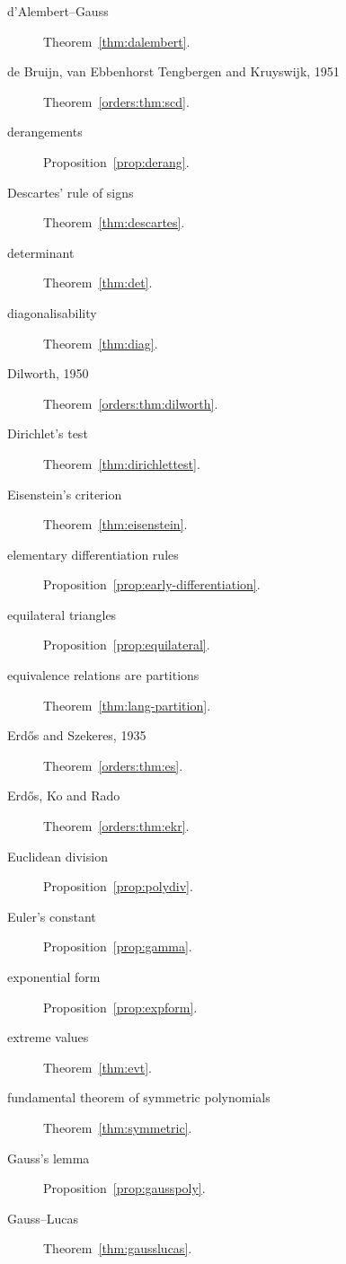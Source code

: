 \begin{description}
\item[d'Alembert--Gauss] Theorem~\ref{thm:dalembert}.
\item[de Bruijn, van Ebbenhorst Tengbergen and Kruyswijk, 1951] Theorem~\ref{orders:thm:scd}.
\item[derangements] Proposition~\ref{prop:derang}.
\item[Descartes' rule of signs] Theorem~\ref{thm:descartes}.
\item[determinant] Theorem~\ref{thm:det}.
\item[diagonalisability] Theorem~\ref{thm:diag}.
\item[Dilworth, 1950] Theorem~\ref{orders:thm:dilworth}.
\item[Dirichlet's test] Theorem~\ref{thm:dirichlettest}.
\item[Eisenstein's criterion] Theorem~\ref{thm:eisenstein}.
\item[elementary differentiation rules] Proposition~\ref{prop:early-differentiation}.
\item[equilateral triangles] Proposition~\ref{prop:equilateral}.
\item[equivalence relations are partitions] Theorem~\ref{thm:lang-partition}.
\item[Erd\H os and Szekeres, 1935] Theorem~\ref{orders:thm:es}.
\item[Erd\H os, Ko and Rado] Theorem~\ref{orders:thm:ekr}.
\item[Euclidean division] Proposition~\ref{prop:polydiv}.
\item[Euler's constant] Proposition~\ref{prop:gamma}.
\item[exponential form] Proposition~\ref{prop:expform}.
\item[extreme values] Theorem~\ref{thm:evt}.
\item[fundamental theorem of symmetric polynomials] Theorem~\ref{thm:symmetric}.
\item[Gauss's lemma] Proposition~\ref{prop:gausspoly}.
\item[Gauss--Lucas] Theorem~\ref{thm:gausslucas}.

\end{description}
